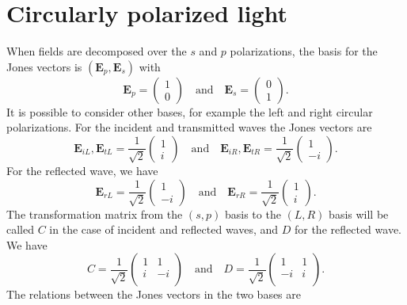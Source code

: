 \section{Circularly polarized light}
When fields are decomposed over the $s$ and $p$ polarizations, the basis for the Jones vectors is $(\mathbf{E}_{p}, \mathbf{E}_{s})$ with
$$
\mathbf{E}_{p} = \begin{pmatrix} 1 \\ 0 \end{pmatrix}
\quad\mathrm{and}\quad
\mathbf{E}_{s} = \begin{pmatrix} 0 \\ 1 \end{pmatrix}.
$$
It is possible to consider other bases, for example the left and right circular polarizations.
For the incident and transmitted waves the Jones vectors are
$$
\mathbf{E}_{iL}, \mathbf{E}_{tL}  = \frac{1}{\sqrt{2}} \begin{pmatrix} 1 \\ i \end{pmatrix}
\quad\mathrm{and}\quad
\mathbf{E}_{iR},\mathbf{E}_{tR}  = \frac{1}{\sqrt{2}} \begin{pmatrix} 1 \\ -i \end{pmatrix}.
$$
For the reflected wave, we have
$$
\mathbf{E}_{rL} = \frac{1}{\sqrt{2}} \begin{pmatrix} 1 \\ -i \end{pmatrix}
\quad\mathrm{and}\quad
\mathbf{E}_{rR} = \frac{1}{\sqrt{2}} \begin{pmatrix} 1 \\ i \end{pmatrix}.
$$
The transformation matrix from the $(s,p)$ basis to the $(L,R)$ basis will be called $C$ in the case of incident and reflected waves, and $D$ for the reflected wave. 
We have
$$
C = \frac{1}{\sqrt{2}} 
\begin{pmatrix} 
1 &  1 \\ 
i & -i \\ 
\end{pmatrix}
\quad\mathrm{and}\quad
D = \frac{1}{\sqrt{2}} 
\begin{pmatrix} 
1 &  1 \\ 
-i & i \\ 
\end{pmatrix}.
$$
The relations between the Jones vectors in the two bases are 
